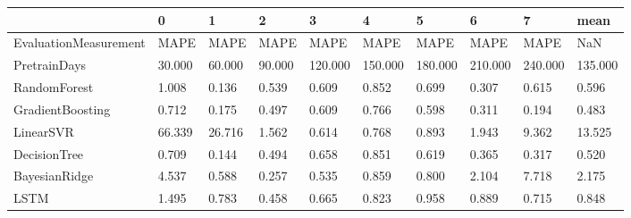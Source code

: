 \begin{tabular}{llllllllll}
\toprule
{} &      0 &      1 &      2 &       3 &       4 &       5 &       6 &       7 &    mean \\
\midrule
EvaluationMeasurement &   MAPE &   MAPE &   MAPE &    MAPE &    MAPE &    MAPE &    MAPE &    MAPE &     NaN \\
PretrainDays          & 30.000 & 60.000 & 90.000 & 120.000 & 150.000 & 180.000 & 210.000 & 240.000 & 135.000 \\
RandomForest          &  1.008 &  0.136 &  0.539 &   0.609 &   0.852 &   0.699 &   0.307 &   0.615 &   0.596 \\
GradientBoosting      &  0.712 &  0.175 &  0.497 &   0.609 &   0.766 &   0.598 &   0.311 &   0.194 &   0.483 \\
LinearSVR             & 66.339 & 26.716 &  1.562 &   0.614 &   0.768 &   0.893 &   1.943 &   9.362 &  13.525 \\
DecisionTree          &  0.709 &  0.144 &  0.494 &   0.658 &   0.851 &   0.619 &   0.365 &   0.317 &   0.520 \\
BayesianRidge         &  4.537 &  0.588 &  0.257 &   0.535 &   0.859 &   0.800 &   2.104 &   7.718 &   2.175 \\
LSTM                  &  1.495 &  0.783 &  0.458 &   0.665 &   0.823 &   0.958 &   0.889 &   0.715 &   0.848 \\
\bottomrule
\end{tabular}

